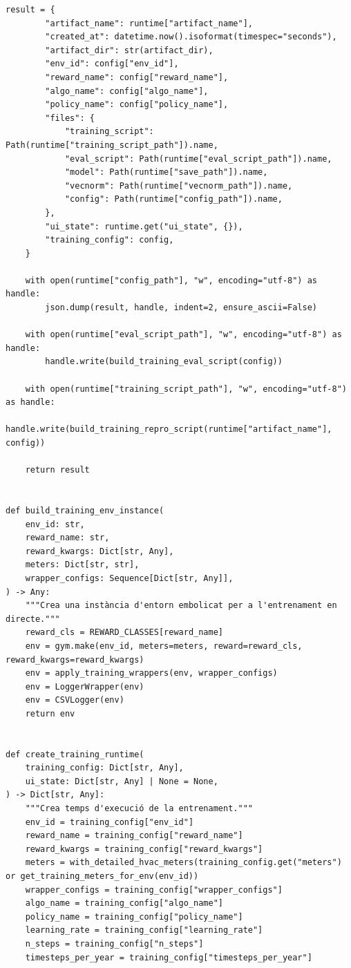 \documentclass[10pt,a4paper]{article}
\begin{document}
\begin{lstlisting}[style=studioPython,caption={backend/entrenar\_agent\_runtime.py},label={lst:backend-entrenar-agent-runtime-py}]
    result = {
        "artifact_name": runtime["artifact_name"],
        "created_at": datetime.now().isoformat(timespec="seconds"),
        "artifact_dir": str(artifact_dir),
        "env_id": config["env_id"],
        "reward_name": config["reward_name"],
        "algo_name": config["algo_name"],
        "policy_name": config["policy_name"],
        "files": {
            "training_script": Path(runtime["training_script_path"]).name,
            "eval_script": Path(runtime["eval_script_path"]).name,
            "model": Path(runtime["save_path"]).name,
            "vecnorm": Path(runtime["vecnorm_path"]).name,
            "config": Path(runtime["config_path"]).name,
        },
        "ui_state": runtime.get("ui_state", {}),
        "training_config": config,
    }

    with open(runtime["config_path"], "w", encoding="utf-8") as handle:
        json.dump(result, handle, indent=2, ensure_ascii=False)

    with open(runtime["eval_script_path"], "w", encoding="utf-8") as handle:
        handle.write(build_training_eval_script(config))

    with open(runtime["training_script_path"], "w", encoding="utf-8") as handle:
        handle.write(build_training_repro_script(runtime["artifact_name"], config))

    return result


def build_training_env_instance(
    env_id: str,
    reward_name: str,
    reward_kwargs: Dict[str, Any],
    meters: Dict[str, str],
    wrapper_configs: Sequence[Dict[str, Any]],
) -> Any:
    """Crea una instància d'entorn embolicat per a l'entrenament en directe."""
    reward_cls = REWARD_CLASSES[reward_name]
    env = gym.make(env_id, meters=meters, reward=reward_cls, reward_kwargs=reward_kwargs)
    env = apply_training_wrappers(env, wrapper_configs)
    env = LoggerWrapper(env)
    env = CSVLogger(env)
    return env


def create_training_runtime(
    training_config: Dict[str, Any],
    ui_state: Dict[str, Any] | None = None,
) -> Dict[str, Any]:
    """Crea temps d'execució de la entrenament."""
    env_id = training_config["env_id"]
    reward_name = training_config["reward_name"]
    reward_kwargs = training_config["reward_kwargs"]
    meters = with_detailed_hvac_meters(training_config.get("meters") or get_training_meters_for_env(env_id))
    wrapper_configs = training_config["wrapper_configs"]
    algo_name = training_config["algo_name"]
    policy_name = training_config["policy_name"]
    learning_rate = training_config["learning_rate"]
    n_steps = training_config["n_steps"]
    timesteps_per_year = training_config["timesteps_per_year"]


\end{lstlisting}
\end{document}
